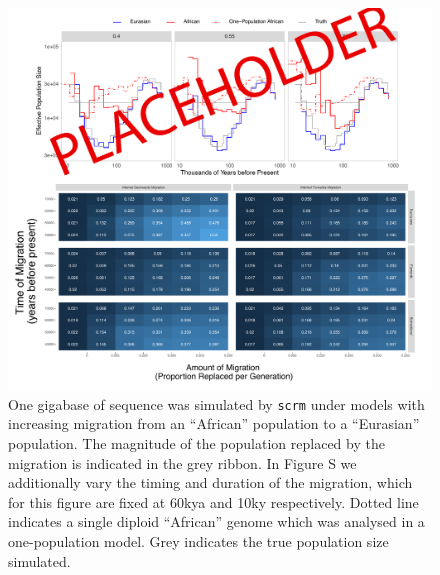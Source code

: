 \documentclass{article}
\begin{document}
\begin{figure}
	\centering
	\includegraphics[width=\textwidth]{../plot/ne/PLACEHOLDER_sims.pdf}
	\caption{One gigabase of sequence was simulated by {\tt scrm} under models with increasing migration from an ``African'' population to a ``Eurasian'' population. The magnitude of the population replaced by the migration is indicated in the grey ribbon. In Figure S we additionally vary the timing and duration of the migration, which for this figure are fixed at 60kya and 10ky respectively. Dotted line indicates a single diploid ``African'' genome which was analysed in a one-population model. Grey indicates the true population size simulated.}
	\label{sim}
\end{figure}
\end{document}
